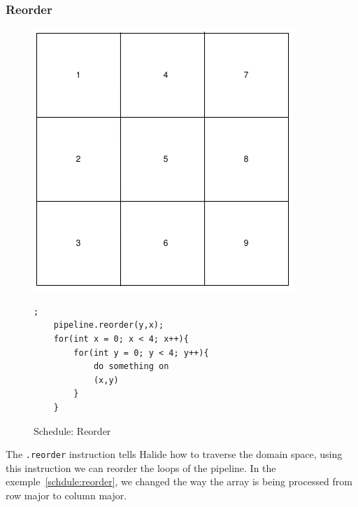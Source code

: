 	\subsubsection{Reorder}


\begin{figure}[H]

		\begin{minipage}[c]{\EIW}
			\centering
		\includegraphics[width=\textwidth]{Images/Reorder.png}
		\end{minipage}
		\begin{minipage}[c]{\ECW}
			\centering
\begin{lstlisting}[label={code:reorder}];
    pipeline.reorder(y,x);
	for(int x = 0; x < 4; x++){
		for(int y = 0; y < 4; y++){
			do something on
			(x,y)
		}
	}
\end{lstlisting}
		\end{minipage}
		\caption{Schedule: Reorder}
		\label{schedule:reorder}
\end{figure}



	The \verb|.reorder| instruction tells Halide how to traverse the domain space, using this instruction we can reorder the loops of the pipeline. In the exemple~\ref{schdule:reorder}, we changed the way the array is being processed from row major to column major.


